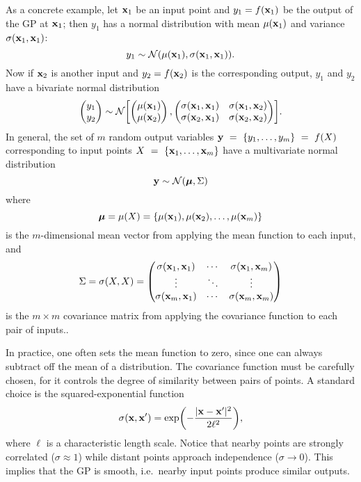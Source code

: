 \documentclass[aps,prc,reprint,superscriptaddress,amsmath]{revtex4-1}
\begin{document}
As a concrete example, let $\mathbf x_1$ be an input point and $y_1 = f(\mathbf x_1)$ be the output of the GP at $\mathbf x_1$; then $y_1$ has a normal distribution with mean $\mu(\mathbf x_1)$ and variance $\sigma(\mathbf x_1, \mathbf x_1)$:
\begin{equation}
  y_1 \sim \mathcal N(\mu(\mathbf x_1), \sigma(\mathbf x_1, \mathbf x_1)).
\end{equation}
Now if $\mathbf x_2$ is another input and $y_2 = f(\mathbf x_2)$ is the corresponding output, $y_1$ and $y_2$ have a bivariate normal distribution
\begin{equation}
  \begin{pmatrix}
    y_1 \\ y_2
  \end{pmatrix}
  \sim \mathcal N\biggl[
    \begin{pmatrix}
      \mu(\mathbf x_1) \\ \mu(\mathbf x_2)
    \end{pmatrix},
    \begin{pmatrix}
      \sigma(\mathbf x_1, \mathbf x_1) & \sigma(\mathbf x_1, \mathbf x_2) \\
      \sigma(\mathbf x_2, \mathbf x_1) & \sigma(\mathbf x_2, \mathbf x_2) \\
    \end{pmatrix}
  \biggr].
\end{equation}
In general, the set of $m$ random output variables $\mathbf y~=~\{y_1, \ldots, y_m\}~=~f(X)$ corresponding to input points $X~=~\{\mathbf x_1, \ldots, \mathbf x_m\}$ have a multivariate normal distribution
\begin{equation}
  \mathbf y \sim \mathcal N(\boldsymbol\mu, \Sigma)
\end{equation}
where
\begin{equation}
  \boldsymbol\mu = \mu(X) = \{\mu(\mathbf x_1), \mu(\mathbf x_2), \ldots, \mu(\mathbf x_m)\} \\
\end{equation}
is the $m$-dimensional mean vector from applying the mean function to each input, and
\begin{equation}
  \Sigma = \sigma(X, X) =
  \begin{pmatrix}
    \sigma(\mathbf x_1, \mathbf x_1) & \cdots & \sigma(\mathbf x_1, \mathbf x_m) \\
    \vdots & \ddots & \vdots \\
    \sigma(\mathbf x_m, \mathbf x_1) & \cdots & \sigma(\mathbf x_m, \mathbf x_m) \\
  \end{pmatrix}
\end{equation}
is the $m \times m$ covariance matrix from applying the covariance function to each pair of inputs..

In practice, one often sets the mean function to zero, since one can always subtract off the mean of a distribution.
The covariance function must be carefully chosen, for it controls the degree of similarity between pairs of points.
A standard choice is the squared-exponential function
\begin{equation}
  \sigma(\mathbf x, \mathbf x') = \exp\biggl( -\frac{|\mathbf x - \mathbf x'|^2}{2\ell^2} \biggr),
\end{equation}
where $\ell$ is a characteristic length scale.
Notice that nearby points are strongly correlated ($\sigma \approx 1$) while distant points approach independence ($\sigma \rightarrow 0$).
This implies that the GP is smooth, i.e.\ nearby input points produce similar outputs.
\end{document}
